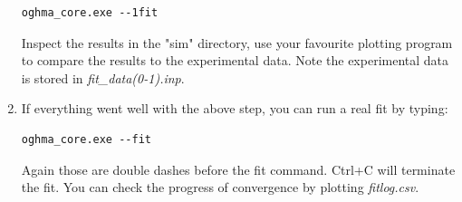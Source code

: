 \begin{enumerate}
\begin{listing}[H]
\begin{verbatim}
oghma_core.exe --1fit
\end{verbatim}
\end{listing}

Inspect the results in the "sim" directory, use your favourite plotting program to compare the results to the experimental data. Note the experimental data is stored in \emph{fit\_data(0-1).inp}.

  \item If everything went well with the above step, you can run a real fit by typing:
\begin{listing}[H]
\begin{verbatim}
oghma_core.exe --fit
\end{verbatim}
\end{listing}
Again those are double dashes before the fit command. Ctrl+C will terminate the fit. You can check the progress of convergence by plotting \emph{fitlog.csv}.

\end{enumerate}





